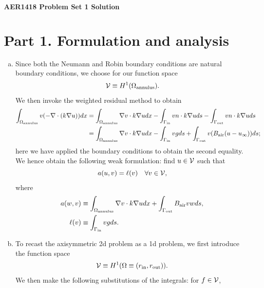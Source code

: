\documentclass[preprint,11pt]{article}
\begin{document}
\begin{Large}\textbf{AER1418 Problem Set 1 Solution}\end{Large} \hfill %

\vspace{1em}

\section*{Part 1. Formulation and analysis}
\begin{enumerate}[(a)]
\item Since both the Neumann and Robin boundary conditions are natural boundary conditions, we choose for our function space
  \begin{equation*}
    \mathcal{V} \equiv H^1(\Omega_{\rm annulus}).
  \end{equation*}
  We then invoke the weighted residual method to obtain
  \begin{align*}
    \int_{\Omega_{\rm annulus}} v (- \nabla \cdot (k \nabla u)) dx
    &=
    \int_{\Omega_{\rm annulus}} \nabla v \cdot k \nabla u dx
    - \int_{\Gamma_{\rm in}} v n \cdot k \nabla u ds
    - \int_{\Gamma_{\rm out}} v n \cdot k \nabla u ds
    \\
    &=
    \int_{\Omega_{\rm annulus}} \nabla v \cdot k \nabla u dx
    - \int_{\Gamma_{\rm in}} v g ds
    + \int_{\Gamma_{\rm out}} v (B_{\rm air} (u  -u_\infty)) ds;
  \end{align*}
  here we have applied the boundary conditions to obtain the second equality.
  We hence obtain the following weak formulation: find $u \in \mathcal{V}$ such that
  \begin{equation*}
    a(u,v) = \ell(v) \quad \forall v \in \mathcal{V},
  \end{equation*}
  where
  \begin{align*}
    a(w,v) &\equiv \int_{\Omega_{\rm annulus}} \nabla v \cdot k \nabla u dx + \int_{\Gamma_{\rm out}} B_{\rm air} v w ds, \\
    \ell(v) &\equiv \int_{\Gamma_{\rm in}} v g ds .
  \end{align*}
\item To recast the axisymmetric 2d problem as a 1d problem, we first introduce the function space
  \begin{equation*}
    \mathcal{V} \equiv H^1(\Omega \equiv (r_{\rm in},r_{\rm out})).
  \end{equation*}
  We then make the following substitutions of the integrals: for $f \in \mathcal{V}$,

\end{enumerate}
\end{document}
